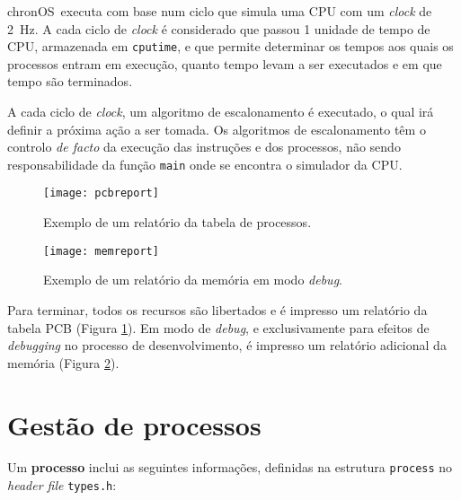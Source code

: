 \documentclass[a4paper,11pt,onecolumn,oneside]{article}
\newcommand{\chronOS}{\textsf{chronOS}}
\begin{document}
	\chronOS~executa com base num ciclo que simula uma \ac{CPU} com um \textit{clock} de \SI{2}{\hertz}. A cada ciclo de \textit{clock} é considerado que passou 1 unidade de tempo de \ac{CPU}, armazenada em \verb|cputime|, e que permite determinar os tempos aos quais os processos entram em execução, quanto tempo levam a ser executados e em que tempo são terminados.
	
	A cada ciclo de \textit{clock}, um algoritmo de escalonamento é executado, o qual irá definir a próxima ação a ser tomada. Os algoritmos de escalonamento têm o controlo \textit{de facto} da execução das instruções e dos processos, não sendo responsabilidade da função \verb|main| onde se encontra o simulador da \ac{CPU}.
	
	\begin{figure}[!btp]
		\centering
		\texttt{[image: pcbreport]}
		\label{fig:pcbreport}
		\caption{Exemplo de um relatório da tabela de processos.}
	\end{figure}
	
	\begin{figure}[!btp]
		\centering
		\texttt{[image: memreport]}
		\label{fig:memreport}
		\caption{Exemplo de um relatório da memória em modo \textit{debug}.}
	\end{figure}

	Para terminar, todos os recursos são libertados e é impresso um relatório da tabela \ac{PCB} (Figura \ref{fig:pcbreport}). Em modo de \textit{debug}, e exclusivamente para efeitos de \textit{debugging} no processo de desenvolvimento, é impresso um relatório adicional da memória (Figura \ref{fig:memreport}).
	
	
	
	
	\section{Gestão de processos}
	\label{sec:process}
	
	Um \textbf{processo} inclui as seguintes informações, definidas na estrutura \verb|process| no \textit{header file} \texttt{types.h}:
	
\end{document}

